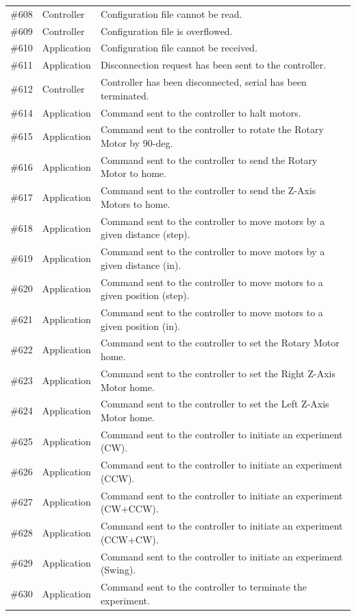 \documentclass[12pt]{report}
\begin{document}
{\begin{longtable}{|l|l|p{9cm}|}
\#608 & Controller & Configuration file cannot be read. \\
\#609 & Controller & Configuration file is overflowed. \\
\#610 & Application & Configuration file cannot be received. \\
\#611 & Application & Disconnection request has been sent to the controller. \\
\#612 & Controller & Controller has been disconnected, serial has been terminated. \\
\#614 & Application & Command sent to the controller to halt motors. \\
\#615 & Application & Command sent to the controller to rotate the Rotary Motor by 90-deg. \\
\#616 & Application & Command sent to the controller to send the Rotary Motor to home. \\
\#617 & Application & Command sent to the controller to send the Z-Axis Motors to home. \\
\#618 & Application & Command sent to the controller to move motors by a given distance (step). \\
\#619 & Application & Command sent to the controller to move motors by a given distance (in). \\
\#620 & Application & Command sent to the controller to move motors to a given position (step). \\
\#621 & Application & Command sent to the controller to move motors to a given position (in). \\
\#622 & Application & Command sent to the controller to set the Rotary Motor home. \\
\#623 & Application & Command sent to the controller to set the Right Z-Axis Motor home. \\
\#624 & Application & Command sent to the controller to set the Left Z-Axis Motor home. \\
\#625 & Application & Command sent to the controller to initiate an experiment (CW). \\
\#626 & Application & Command sent to the controller to initiate an experiment (CCW). \\
\#627 & Application & Command sent to the controller to initiate an experiment (CW+CCW). \\
\#628 & Application & Command sent to the controller to initiate an experiment (CCW+CW). \\
\#629 & Application & Command sent to the controller to initiate an experiment (Swing). \\
\#630 & Application & Command sent to the controller to terminate the experiment. \\
\hline
\end{longtable}
}
\end{document}
